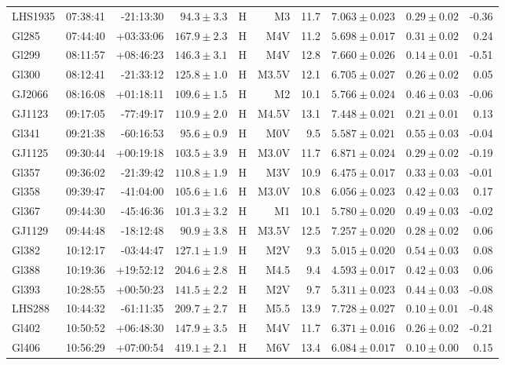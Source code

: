 \documentclass[structabstract]{aa}
\begin{document}
\begin{center}
\begin{longtable}{ l r r r r r r r r r}
LHS1935 & 07:38:41 & -21:13:30 & $94.3\pm 3.3$ & H & M3 & 11.7 & $7.063\pm0.023$ & $0.29\pm0.02$ & -0.36 \\
Gl285 & 07:44:40 & +03:33:06 & $167.9\pm 2.3$ & H & M4V & 11.2 & $5.698\pm0.017$ & $0.31\pm0.02$ & 0.24 \\
Gl299 & 08:11:57 & +08:46:23 & $146.3\pm 3.1$ & H & M4V & 12.8 & $7.660\pm0.026$ & $0.14\pm0.01$ & -0.51 \\
Gl300 & 08:12:41 & -21:33:12 & $125.8\pm 1.0$ & H & M3.5V & 12.1 & $6.705\pm0.027$ & $0.26\pm0.02$ & 0.05 \\
GJ2066 & 08:16:08 & +01:18:11 & $109.6\pm 1.5$ & H & M2 & 10.1 & $5.766\pm0.024$ & $0.46\pm0.03$ & -0.06 \\
GJ1123 & 09:17:05 & -77:49:17 & $110.9\pm 2.0$ & H & M4.5V & 13.1 & $7.448\pm0.021$ & $0.21\pm0.01$ & 0.13 \\
Gl341 & 09:21:38 & -60:16:53 & $95.6\pm 0.9$ & H & M0V &  9.5 & $5.587\pm0.021$ & $0.55\pm0.03$ & -0.04 \\
GJ1125 & 09:30:44 & +00:19:18 & $103.5\pm 3.9$ & H & M3.0V & 11.7 & $6.871\pm0.024$ & $0.29\pm0.02$ & -0.19 \\
Gl357 & 09:36:02 & -21:39:42 & $110.8\pm 1.9$ & H & M3V & 10.9 & $6.475\pm0.017$ & $0.33\pm0.03$ & -0.01 \\
Gl358 & 09:39:47 & -41:04:00 & $105.6\pm 1.6$ & H & M3.0V & 10.8 & $6.056\pm0.023$ & $0.42\pm0.03$ & 0.17 \\
Gl367 & 09:44:30 & -45:46:36 & $101.3\pm 3.2$ & H & M1 & 10.1 & $5.780\pm0.020$ & $0.49\pm0.03$ & -0.02 \\
GJ1129 & 09:44:48 & -18:12:48 & $90.9\pm 3.8$ & H & M3.5V & 12.5 & $7.257\pm0.020$ & $0.28\pm0.02$ & 0.06 \\
Gl382 & 10:12:17 & -03:44:47 & $127.1\pm 1.9$ & H & M2V &  9.3 & $5.015\pm0.020$ & $0.54\pm0.03$ & 0.08 \\
Gl388 & 10:19:36 & +19:52:12 & $204.6\pm 2.8$ & H & M4.5 &  9.4 & $4.593\pm0.017$ & $0.42\pm0.03$ & 0.06 \\
Gl393 & 10:28:55 & +00:50:23 & $141.5\pm 2.2$ & H & M2V &  9.7 & $5.311\pm0.023$ & $0.44\pm0.03$ & -0.08 \\
LHS288 & 10:44:32 & -61:11:35 & $209.7\pm 2.7$ & H & M5.5 & 13.9 & $7.728\pm0.027$ & $0.10\pm0.01$ & -0.48 \\
Gl402 & 10:50:52 & +06:48:30 & $147.9\pm 3.5$ & H & M4V & 11.7 & $6.371\pm0.016$ & $0.26\pm0.02$ & -0.21 \\
Gl406 & 10:56:29 & +07:00:54 & $419.1\pm 2.1$ & H & M6V & 13.4 & $6.084\pm0.017$ & $0.10\pm0.00$ & 0.15 \\

\end{longtable}
\end{center}
\end{document}
